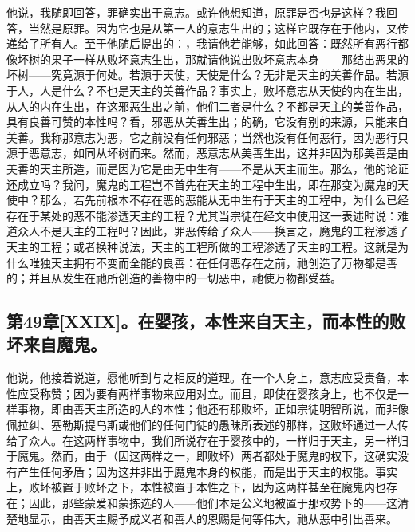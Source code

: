 他说，我随即回答，罪确实出于意志。或许他想知道，原罪是否也是这样？我回答，当然是原罪。因为它也是从第一人的意志生出的；这样它既存在于他内，又传递给了所有人。至于他随后提出的：，我请他若能够，如此回答：既然所有恶行都像坏树的果子一样从败坏意志生出，那就请他说出败坏意志本身——那结出恶果的坏树——究竟源于何处。若源于天使，天使是什么？无非是天主的美善作品。若源于人，人是什么？不也是天主的美善作品？事实上，败坏意志从天使的内在生出，从人的内在生出，在这邪恶生出之前，他们二者是什么？不都是天主的美善作品，具有良善可赞的本性吗？看，邪恶从美善生出；的确，它没有别的来源，只能来自美善。我称那意志为恶，它之前没有任何邪恶；当然也没有任何恶行，因为恶行只源于恶意志，如同从坏树而来。然而，恶意志从美善生出，这并非因为那美善是由美善的天主所造，而是因为它是由无中生有——不是从天主而生。那么，他的论证还成立吗？我问，魔鬼的工程岂不首先在天主的工程中生出，即在那变为魔鬼的天使中？那么，若先前根本不存在恶的恶能从无中生有于天主的工程中，为什么已经存在于某处的恶不能渗透天主的工程？尤其当宗徒在经文中使用这一表述时说：难道众人不是天主的工程吗？因此，罪恶传给了众人——换言之，魔鬼的工程渗透了天主的工程；或者换种说法，天主的工程所做的工程渗透了天主的工程。这就是为什么唯独天主拥有不变而全能的良善：在任何恶存在之前，祂创造了万物都是善的；并且从发生在祂所创造的善物中的一切恶中，祂使万物都受益。\par


\subsection{第49章[XXIX]。在婴孩，本性来自天主，而本性的败坏来自魔鬼。}

他说，他接着说道，愿他听到与之相反的道理。在一个人身上，意志应受责备，本性应受称赞；因为要有两样事物来应用对立。而且，即使在婴孩身上，也不仅是一样事物，即由善天主所造的人的本性；他还有那败坏，正如宗徒明智所说，而非像佩拉纠、塞勒斯提乌斯或他们的任何门徒的愚昧所表述的那样，这败坏通过一人传给了众人。在这两样事物中，我们所说存在于婴孩中的，一样归于天主，另一样归于魔鬼。然而，由于（因这两样之一，即败坏）两者都处于魔鬼的权下，这确实没有产生任何矛盾；因为这并非出于魔鬼本身的权能，而是出于天主的权能。事实上，败坏被置于败坏之下，本性被置于本性之下，因为这两样甚至在魔鬼内也存在；因此，那些蒙爱和蒙拣选的人——他们本是公义地被置于那权势下的——这清楚地显示，由善天主赐予成义者和善人的恩赐是何等伟大，祂从恶中引出善来。\par

